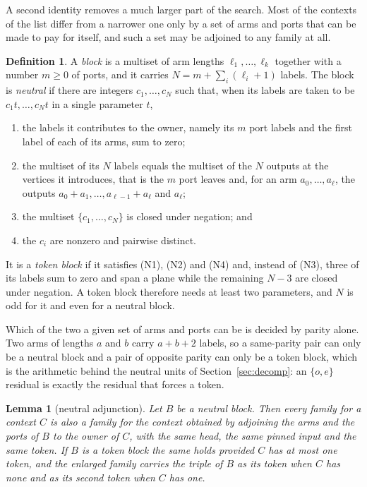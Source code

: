 \documentclass[11pt,a4paper]{article}
\theoremstyle{plain}
\newtheorem{lemma}[theorem]{Lemma}
\theoremstyle{definition}
\newtheorem{definition}[theorem]{Definition}
\theoremstyle{remark}
\begin{document}
A second identity removes a much larger part of the search.  Most of the
contexts of the list differ from a narrower one only by a set of arms and
ports that can be made to pay for itself, and such a set may be adjoined to
any family at all.

\begin{definition}\label{def:block}
A \emph{block} is a multiset of arm lengths $\ell_1,\dots,\ell_k$ together
with a number $m\ge0$ of ports, and it carries $N=m+\sum_i(\ell_i+1)$ labels.
The block is \emph{neutral} if there are integers $c_1,\dots,c_N$ such that,
when its labels are taken to be $c_1t,\dots,c_Nt$ in a single parameter $t$,
\begin{enumerate}
\item[(N1)] the labels it contributes to the owner, namely its $m$ port labels
  and the first label of each of its arms, sum to zero;
\item[(N2)] the multiset of its $N$ labels equals the multiset of the $N$
  outputs at the vertices it introduces, that is the $m$ port leaves and, for
  an arm $a_0,\dots,a_\ell$, the outputs $a_0+a_1,\dots,a_{\ell-1}+a_\ell$ and
  $a_\ell$;
\item[(N3)] the multiset $\{c_1,\dots,c_N\}$ is closed under negation; and
\item[(N4)] the $c_i$ are nonzero and pairwise distinct.
\end{enumerate}
It is a \emph{token block} if it satisfies (N1), (N2) and (N4) and, instead of
(N3), three of its labels sum to zero and span a plane while the remaining
$N-3$ are closed under negation.  A token block therefore needs at least two
parameters, and $N$ is odd for it and even for a neutral block.
\end{definition}

Which of the two a given set of arms and ports can be is decided by parity
alone.  Two arms of lengths $a$ and $b$ carry $a+b+2$ labels, so a same-parity
pair can only be a neutral block and a pair of opposite parity can only be a
token block, which is the arithmetic behind the neutral units of
Section~\ref{sec:decomp}: an $\{o,e\}$ residual is exactly the residual that
forces a token.

\begin{lemma}[neutral adjunction]\label{lem:adjunction}
Let $B$ be a neutral block.  Then every family for a context $C$ is also a
family for the context obtained by adjoining the arms and the ports of $B$ to
the owner of $C$, with the same head, the same pinned input and the same
token.  If $B$ is a token block the same holds provided $C$ has at most one
token, and the enlarged family carries the triple of $B$ as its token when $C$
has none and as its second token when $C$ has one.
\end{lemma}
\end{document}
